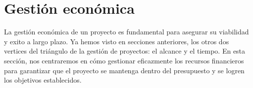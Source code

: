 \section{Gestión económica}

La gestión económica de un proyecto es fundamental para asegurar su viabilidad y exito a largo plazo. Ya hemos visto en secciones anteriores, los otros dos vertices 
del triángulo de la gestión de proyectos: el alcance y el tiempo. En esta sección, nos centraremos en cómo gestionar eficazmente los recursos financieros para garantizar
que el proyecto se mantenga dentro del presupuesto y se logren los objetivos establecidos. 







